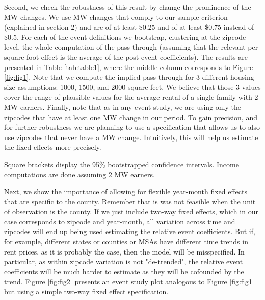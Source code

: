 \documentclass{article}
\begin{document}
Second, we check the robustness of this result by change the prominence of the MW changes. We use MW changes that comply to our sample criterion (explained in section 2) and are of at least \$0.25 and of at least \$0.75 instead of \$0.5. For each of the event definitions we bootstrap, clustering at the zipcode level, the whole computation of the pass-through (assuming that the relevant per square foot effect is the average of the post event coefficients). The results are presented in Table \ref{tab:table1}, where the middle column corresponds to Figure \ref{fig:fig1}. Note that we compute the implied pass-through for 3 different housing size assumptions: 1000, 1500, and 2000 square feet. We believe that those 3 values cover the range of plausible values for the average rental of a single family with 2 MW earners. Finally, note that as in any event-study, we are using only the zipcodes that have at least one MW change in our period. To gain precision, and for further robustness we are planning to use a specification that allows us to also use zipcodes that never have a MW change. Intuitively, this will help us estimate the fixed effects more precisely. 

\begin{table}[h!]
    \centering
    \resizebox{\textwidth}{!}{
    
    }
     \vspace{1ex}
    {\raggedright Square brackets display the 95\% bootstrapped confidence intervals. Income computations are done assuming 2 MW earners.\par}
    \caption{Bootstrapping the main objects of interest}
    \label{tab:table1}
\end{table}

Next, we show the importance of allowing for flexible year-month fixed effects that are specific to the county. Remember that is was not feasible when the unit of observation is the county. If we just include two-way fixed effects, which in our case corresponds to zipcode and year-month, all variation across time and zipcodes will end up being used estimating the relative event coefficients. But if, for example, different states or counties or MSAs have different time trends in rent prices, as it is probably the case, then the model will be misspecified. In particular, as within zipcode variation is not "de-trended", the relative event coefficients will be much harder to estimate as they will be cofounded by the trend. Figure \ref{fig:fig2} presents an event study plot analogous to Figure \ref{fig:fig1} but using a simple two-way fixed effect specification. 
\end{document}
